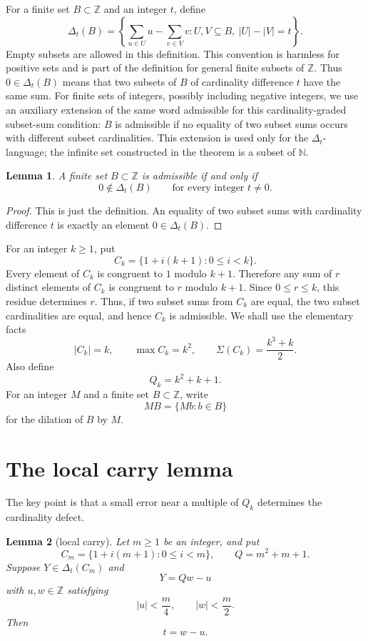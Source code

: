 \documentclass[11pt]{article}
\newtheorem{lemma}{Lemma}
\newcommand{\N}{\mathbb{N}}
\newcommand{\Z}{\mathbb{Z}}
\newcommand{\D}{\Delta}
\newcommand{\Sig}{\Sigma}
\begin{document}
For a finite set $B\subset\Z$ and an integer $t$, define
\[
\D_t(B)=
\left\{
\sum_{u\in U}u-\sum_{v\in V}v:
U,V\subseteq B,\ |U|-|V|=t
\right\}.
\]
Empty subsets are allowed in this definition.  This convention is harmless for positive sets and is part of the definition for general finite subsets of $\Z$.  Thus $0\in \D_t(B)$ means that two subsets of $B$ of cardinality difference $t$ have the same sum.  For finite sets of integers, possibly including negative integers, we use an auxiliary extension of the same word admissible for this cardinality-graded subset-sum condition: $B$ is admissible if no equality of two subset sums occurs with different subset cardinalities.  This extension is used only for the $\D_t$-language; the infinite set constructed in the theorem is a subset of $\N$.

\begin{lemma}\label{lem:admissible-delta}
A finite set $B\subset\Z$ is admissible if and only if
\[
        0\notin \D_t(B)\qquad\text{for every integer }t\ne 0.
\]
\end{lemma}

\begin{proof}
This is just the definition.  An equality of two subset sums with cardinality difference $t$ is exactly an element $0\in \D_t(B)$.
\end{proof}

For an integer $k\ge1$, put
\[
        C_k=\{1+i(k+1):0\le i<k\}.
\]
Every element of $C_k$ is congruent to $1$ modulo $k+1$.  Therefore any sum of $r$ distinct elements of $C_k$ is congruent to $r$ modulo $k+1$.  Since $0\le r\le k$, this residue determines $r$.  Thus, if two subset sums from $C_k$ are equal, the two subset cardinalities are equal, and hence $C_k$ is admissible.  We shall use the elementary facts
\[
        |C_k|=k,
        \qquad
        \max C_k=k^2,
        \qquad
        \Sig(C_k)=\frac{k^3+k}{2}.
\]
Also define
\[
        Q_k=k^2+k+1.
\]
For an integer $M$ and a finite set $B\subset\Z$, write
\[
        MB=\{Mb:b\in B\}
\]
for the dilation of $B$ by $M$.

\section{The local carry lemma}

The key point is that a small error near a multiple of $Q_k$ determines the cardinality defect.

\begin{lemma}[local carry]\label{lem:local-carry}
Let $m\ge1$ be an integer, and put
\[
        C_m=\{1+i(m+1):0\le i<m\},
        \qquad
        Q=m^2+m+1.
\]
Suppose $Y\in \D_t(C_m)$ and
\[
        Y=Qw-u
\]
with $u,w\in\Z$ satisfying
\[
        |u|<\frac m4,
        \qquad
        |w|<\frac m2.
\]
Then
\[
        t=w-u.
\]
\end{lemma}
\end{document}
